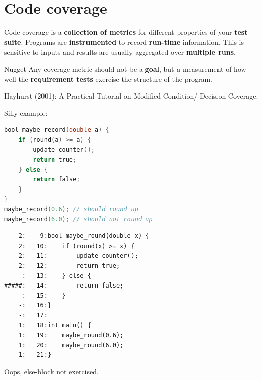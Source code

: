 \documentclass[xcolor = {dvipsnames, table}, aspectratio=169]{beamer}
\begin{document}
\section{Code coverage}
\begin{frame}
    Code coverage is a \textbf{collection of metrics} for different properties
    of your \textbf{test suite}. Programs are \textbf{instrumented} to record
    \textbf{run-time} information. This is sensitive to inputs and results are
    usually aggregated over \textbf{multiple runs}.
\end{frame}

\begin{frame}
    \begin{block}{Nugget}
        Any coverage metric should not be a \textbf{goal}, but a measurement of
        how well the \textbf{requirement tests} exercise the structure of
        the program.
    \end{block}

    \begin{block}{}
        \small{
            Hayhurst (2001): A Practical Tutorial on Modified Condition/
            Decision Coverage.
        }
    \end{block}
\end{frame}

\begin{frame}[fragile]
    Silly example:

    \begin{lstlisting}[language = C]
bool maybe_record(double a) {
    if (round(a) >= a) {
        update_counter();
        return true;
    } else {
        return false;
    }
}
maybe_record(0.6); // should round up
maybe_record(6.0); // should not round up
\end{lstlisting}
\end{frame}

\begin{frame}[fragile]
    \begin{lstlisting}
    2:    9:bool maybe_round(double x) {
    2:   10:    if (round(x) >= x) {
    2:   11:        update_counter();
    2:   12:        return true;
    -:   13:    } else {
#####:   14:        return false;
    -:   15:    }
    -:   16:}
    -:   17:
    1:   18:int main() {
    1:   19:    maybe_round(0.6);
    1:   20:    maybe_round(6.0);
    1:   21:}
    \end{lstlisting}
    Oops, else-block not exercised.
\end{frame}
\end{document}

